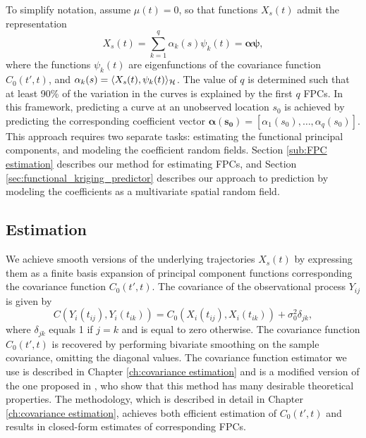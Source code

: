 To simplify notation, assume $\mu(t)=0$, so that functions $X_s(t)$ admit the representation 
\begin{equation}
	X_{s}(t) = \sum_{k=1}^{q} \alpha_k(s)\psi_k(t) = \boldsymbol{\alpha}\boldsymbol{\psi}, \label{kriging: fpc expansion}
\end{equation}
where the functions $\psi_k(t)$ are eigenfunctions of the covariance function $C_0(t',t)$, and $\alpha_k(s) = \langle X_s(t),  \psi_k(t) \rangle_{\mathcal{H}}$. The value of $q$ is determined such that at least 90\% of the variation in the curves is explained by the first $q$ FPCs. In this framework, predicting a curve at an unobserved location $s_0$ is achieved by predicting the corresponding coefficient vector $\boldsymbol{\alpha(s_0)}=[\alpha_1(s_0), \dots, \alpha_q(s_0)]$. This approach requires two separate tasks: estimating the functional principal components, and modeling the coefficient random fields. Section \ref{sub:FPC estimation} describes our method for estimating FPCs, and Section \ref{sec:functional_kriging_predictor} describes our approach to prediction by modeling the coefficients as a multivariate spatial random field.
\subsection{Estimation} %
\label{sub:estimation}

We achieve smooth versions of the underlying trajectories $X_s(t)$ by expressing them as a finite basis expansion of principal component functions corresponding the	 covariance function $C_0(t',t)$. The covariance of the observational process $Y_{ij}$ is given by
\begin{equation}
	C(Y_i(t_{ij}), Y_i(t_{ik})) = C_0(X_i(t_{ij}), X_i(t_{ik})) + \sigma^2_0 \delta_{jk},
\end{equation}
where $\delta_{jk}$ equals 1 if $j=k$ and is equal to zero otherwise. The covariance function $C_0(t',t)$ is recovered by performing bivariate smoothing on the sample covariance, omitting the diagonal values.  The covariance function estimator we use is described in Chapter \ref{ch:covariance estimation} and is a modified version of the one proposed in \cite{Cai:2010vr}, who show that this method has many desirable theoretical properties. The methodology, which is described in detail in Chapter \ref{ch:covariance estimation}, achieves both efficient estimation of $C_0(t',t)$ and results in closed-form estimates of corresponding FPCs.

